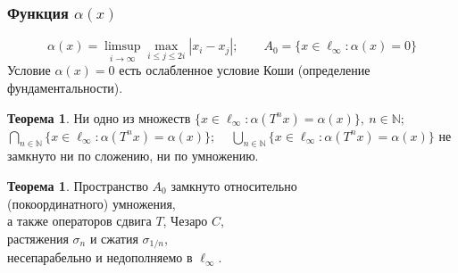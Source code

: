 \documentclass[10pt,pdf,hyperref={unicode},aspectratio=169,color={usenames, dvipsnames}]{beamer}
\theoremstyle{definition}
\newtheorem{ttheorem}[llemma]{Теорема}
\begin{document}
\begin{frame}
	\frametitle{Функция $\alpha(x)$}
	\begin{equation*}
		\alpha(x) = \limsup_{i\to\infty} \max_{i \leq j \leq 2i} |x_i-x_j|
		;\qquad
		A_0 = \{x\in\ell_\infty : \alpha(x) = 0\}
	\end{equation*}
	Условие $\alpha(x) = 0$ есть ослабленное условие Коши (определение фундаментальности).




	\begin{ttheorem}
		Ни одно из множеств
		$\displaystyle
			\{x \in \ell_\infty : \alpha(T^n x) = \alpha(x) \}, ~n\in\mathbb{N};
		$~
		$\displaystyle
			\bigcap\limits_{n\in\mathbb{N}}\{x \in \ell_\infty : \alpha(T^n x) = \alpha(x) \};
		$ ~
		$\displaystyle
			\bigcup_{n\in\mathbb{N}}\{x \in \ell_\infty : \alpha(T^n x) = \alpha(x) \}
		$ не замкнуто ни по сложению, ни по умножению.
	\end{ttheorem}

	\begin{ttheorem}
		Пространство $A_0$ замкнуто относительно
		\\
		(покоординатного) умножения,
		\\
		а также операторов сдвига $T$, Чезаро $C$,
		\\
		растяжения $\sigma_n$ и сжатия $\sigma_{1/n}$,
		\\
		несепарабельно и недополняемо в $\ell_\infty$.
	\end{ttheorem}

\end{frame}



\def\rinc{\color[rgb]{0.5,0,0}{(РИНЦ)~}}
\def\vak{\color[rgb]{0.5,0.5,0}{(ВАК)~}}
\def\mzm{\color[rgb]{0,0.5,0}{(WoS)~(Scopus)~}}

\end{document}
